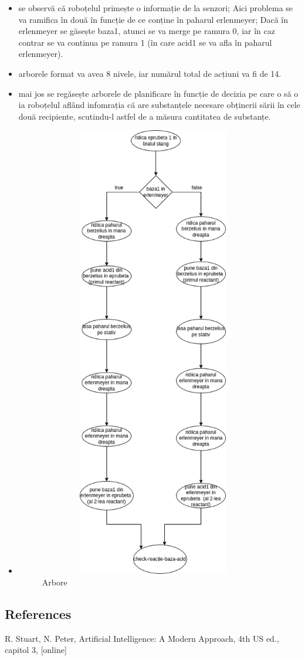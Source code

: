 \begin{itemize}
    \setlength\itemsep{0em}
    \item se observă că roboțelul primește o informație de la senzori; Aici problema se va ramifica în două în funcție de ce conține în paharul erlenmeyer; Dacă în erlenmeyer se găsește baza1, atunci se va merge pe ramura 0, iar în caz contrar se va continua pe ramura 1 (în care acid1 se va afla în paharul erlenmeyer).
    \item arborele format va avea 8 nivele, iar numărul total de acțiuni va fi de 14. 
    \item mai jos se regăsește arborele de planificare în funcție de decizia pe care o să o ia roboțelul aflând infomrația că are substanțele necesare obținerii sării în cele două recipiente, scutindu-l astfel de a măsura cantitatea de substanțe.

   \item
\begin{figure}[htp]
    \centering
    \includegraphics[width=10cm,height=20cm]{text/images/arbore.png}
    \caption{Arbore}
    \label{fig:galaxy}
\end{figure}
\end{itemize}














\subsection{References}
R. Stuart, N. Peter, Artificial Intelligence: A Modern Approach, 4th US ed., capitol 3, [online]
